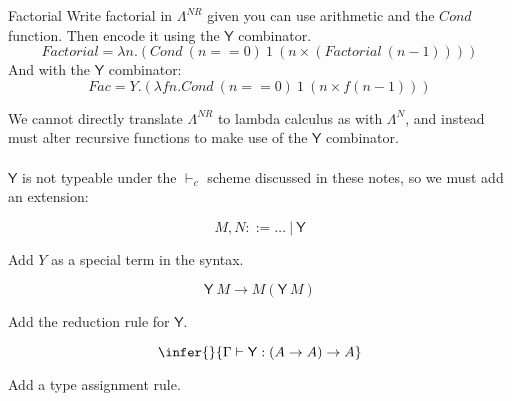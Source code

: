 \begin{examplebox}{Factorial}
    Write factorial in $\Lambda^{NR}$ given you can use arithmetic and the $Cond$ function. Then encode it using the $\mathsf{Y}$ combinator.
    \tcblower
    \[Factorial = \lambda n . (Cond \ (n == 0) \ 1 \ (n \times (Factorial \ (n - 1))) )\]
    And with the $\mathsf{Y}$ combinator:
    \[Fac = Y . (\lambda f n . Cond \ (n == 0) \ 1 \ (n \times f (n - 1)))\]
\end{examplebox}
We cannot directly translate $\Lambda^{NR}$ to lambda calculus as with $\Lambda^N$, and instead must alter recursive functions to make use of the $\mathsf{Y}$ combinator.
\\
\\ $\mathsf{Y}$ is not typeable under the $\vdash_c$ scheme discussed in these notes, so we must add an extension:
\\ \begin{minipage}[b]{.33\textwidth}
    \[M, N ::= \dots \ | \ \mathsf{Y}\]
    \centerline{Add $Y$ as a special term in the syntax.}
\end{minipage}
\begin{minipage}[b]{.33\textwidth}
    \[\mathsf{Y} \ M \to M (\mathsf{Y} \ M)\]
    \centerline{Add the reduction rule for $\mathsf{Y}$.}
\end{minipage}
\begin{minipage}[b]{.33\textwidth}
    \[\infer{}{\Gamma \vdash \mathsf{Y} : (A \to A) \to A}\]
    \centerline{Add a type assignment rule.}
\end{minipage}

